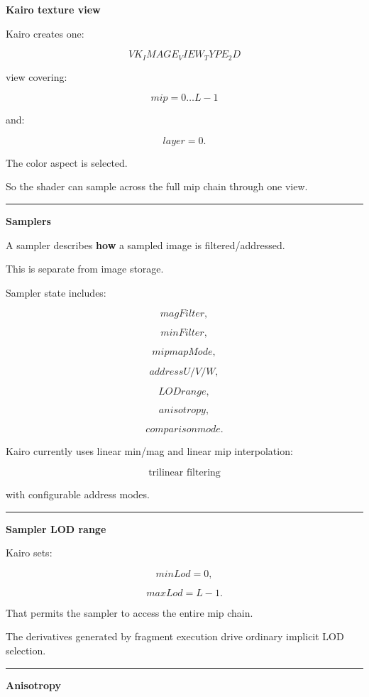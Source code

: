 \textbf{Kairo texture view}

Kairo creates one:

\[
VK_IMAGE_VIEW_TYPE_2D
\]

view covering:

\[
mip=0\dots L-1
\]

and:

\[
layer=0.
\]

The color aspect is selected.

So the shader can sample across the full mip chain through one view.

\begin{center}\rule{0.5\linewidth}{0.5pt}\end{center}

\textbf{Samplers}

A sampler describes \textbf{how} a sampled image is filtered/addressed.

This is separate from image storage.

Sampler state includes:

\[
magFilter,
\]

\[
minFilter,
\]

\[
mipmapMode,
\]

\[
addressU/V/W,
\]

\[
LOD range,
\]

\[
anisotropy,
\]

\[
comparison mode.
\]

Kairo currently uses linear min/mag and linear mip interpolation:

\[
\boxed{\text{trilinear filtering}}
\]

with configurable address modes.

\begin{center}\rule{0.5\linewidth}{0.5pt}\end{center}

\textbf{Sampler LOD range}

Kairo sets:

\[
minLod=0,
\]

\[
maxLod=L-1.
\]

That permits the sampler to access the entire mip chain.

The derivatives generated by fragment execution drive ordinary implicit LOD selection.

\begin{center}\rule{0.5\linewidth}{0.5pt}\end{center}

\textbf{Anisotropy}


